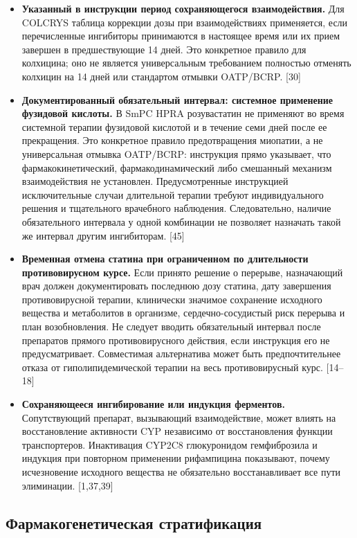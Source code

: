 \documentclass[11pt]{article}
\begin{document}
\begin{itemize}
\item \textbf{Указанный в инструкции период сохраняющегося взаимодействия.} Для COLCRYS таблица коррекции дозы при взаимодействиях применяется, если перечисленные ингибиторы принимаются в настоящее время или их прием завершен в предшествующие 14 дней. Это конкретное правило для колхицина; оно не является универсальным требованием полностью отменять колхицин на 14 дней или стандартом отмывки OATP/BCRP. [30]
\item \textbf{Документированный обязательный интервал: системное применение фузидовой кислоты.} В SmPC HPRA розувастатин не применяют во время системной терапии фузидовой кислотой и в течение семи дней после ее прекращения. Это конкретное правило предотвращения миопатии, а не универсальная отмывка OATP/BCRP: инструкция прямо указывает, что фармакокинетический, фармакодинамический либо смешанный механизм взаимодействия не установлен. Предусмотренные инструкцией исключительные случаи длительной терапии требуют индивидуального решения и тщательного врачебного наблюдения. Следовательно, наличие обязательного интервала у одной комбинации не позволяет назначать такой же интервал другим ингибиторам. [45]
\item \textbf{Временная отмена статина при ограниченном по длительности противовирусном курсе.} Если принято решение о перерыве, назначающий врач должен документировать последнюю дозу статина, дату завершения противовирусной терапии, клинически значимое сохранение исходного вещества и метаболитов в организме, сердечно-сосудистый риск перерыва и план возобновления. Не следует вводить обязательный интервал после препаратов прямого противовирусного действия, если инструкция его не предусматривает. Совместимая альтернатива может быть предпочтительнее отказа от гиполипидемической терапии на весь противовирусный курс. [14--18]
\item \textbf{Сохраняющееся ингибирование или индукция ферментов.} Сопутствующий препарат, вызывающий взаимодействие, может влиять на восстановление активности CYP независимо от восстановления функции транспортеров. Инактивация CYP2C8 глюкуронидом гемфиброзила и индукция при повторном применении рифампицина показывают, почему исчезновение исходного вещества не обязательно восстанавливает все пути элиминации. [1,37,39]
\end{itemize}

\subsection{Фармакогенетическая стратификация}
\end{document}
